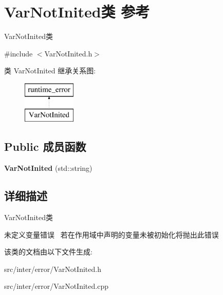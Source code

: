\hypertarget{class_var_not_inited}{}\section{Var\+Not\+Inited类 参考}
\label{class_var_not_inited}


Var\+Not\+Inited类  




{\ttfamily \#include $<$Var\+Not\+Inited.\+h$>$}

类 Var\+Not\+Inited 继承关系图\+:\begin{figure}[H]
\begin{center}
\leavevmode
\includegraphics[height=2.000000cm]{class_var_not_inited}
\end{center}
\end{figure}
\subsection*{Public 成员函数}
\begin{DoxyCompactItemize}
\item 
\mbox{\label{class_var_not_inited_a14d78a6013df47440f2eba2074c1ef62}} 
{\bfseries Var\+Not\+Inited} (std\+::string)
\end{DoxyCompactItemize}


\subsection{详细描述}
Var\+Not\+Inited类 

未定义变量错误~\newline
若在作用域中声明的变量未被初始化将抛出此错误 

该类的文档由以下文件生成\+:\begin{DoxyCompactItemize}
\item 
src/inter/error/Var\+Not\+Inited.\+h\item 
src/inter/error/Var\+Not\+Inited.\+cpp\end{DoxyCompactItemize}
